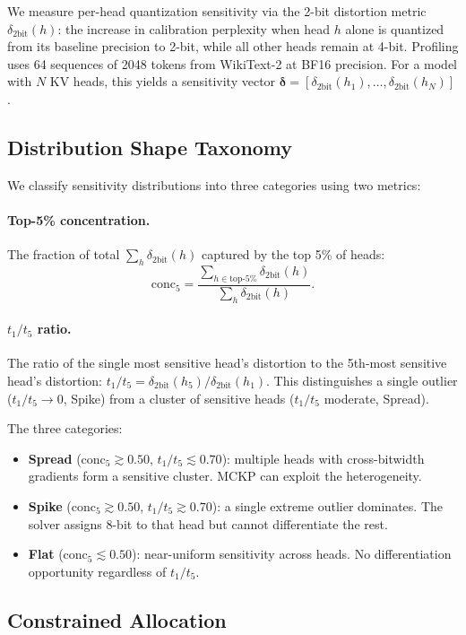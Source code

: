 \documentclass[11pt,a4paper]{article}
\newcommand{\deltab}{\delta_{\text{2bit}}}
\newcommand{\ttf}{t_1/t_5}
\begin{document}
We measure per-head quantization sensitivity via the 2-bit distortion metric $\deltab(h)$: the increase in calibration perplexity when head $h$ alone is quantized from its baseline precision to 2-bit, while all other heads remain at 4-bit.
Profiling uses 64 sequences of 2048 tokens from WikiText-2 at BF16 precision.
For a model with $N$ KV heads, this yields a sensitivity vector $\boldsymbol{\delta} = [\deltab(h_1), \ldots, \deltab(h_N)]$.

\subsection{Distribution Shape Taxonomy}

We classify sensitivity distributions into three categories using two metrics:

\paragraph{Top-5\% concentration.}
The fraction of total $\sum_h \deltab(h)$ captured by the top 5\% of heads:
\[
  \text{conc}_{5} = \frac{\sum_{h \in \text{top-5\%}} \deltab(h)}{\sum_{h} \deltab(h)}.
\]

\paragraph{$\ttf$ ratio.}
The ratio of the single most sensitive head's distortion to the 5th-most sensitive head's distortion: $\ttf = \deltab(h_5) / \deltab(h_1)$.
This distinguishes a single outlier ($\ttf \to 0$, Spike) from a cluster of sensitive heads ($\ttf$ moderate, Spread).

\medskip\noindent
The three categories:
\begin{itemize}
\item \textbf{Spread} ($\text{conc}_5 \gtrsim 0.50$, $\ttf \lesssim 0.70$): multiple heads with cross-bitwidth gradients form a sensitive cluster. MCKP can exploit the heterogeneity.
\item \textbf{Spike} ($\text{conc}_5 \gtrsim 0.50$, $\ttf \gtrsim 0.70$): a single extreme outlier dominates. The solver assigns 8-bit to that head but cannot differentiate the rest.
\item \textbf{Flat} ($\text{conc}_5 \lesssim 0.50$): near-uniform sensitivity across heads. No differentiation opportunity regardless of $\ttf$.
\end{itemize}

\subsection{Constrained Allocation}
\end{document}
